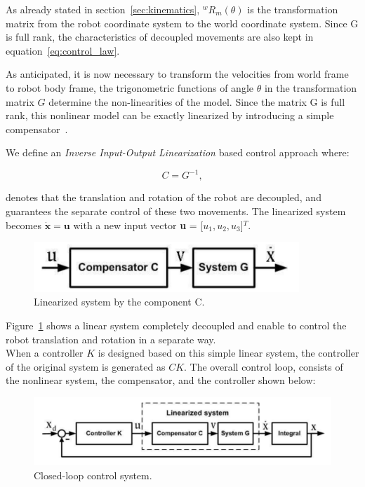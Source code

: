 As already stated in section~\ref{sec:kinematics}, $^wR_m(\theta)$ is the transformation matrix from the robot coordinate system to the world coordinate system. Since G is full rank, the characteristics of decoupled movements are also kept in equation~\ref{eq:control_law}.

As anticipated, it is now necessary to transform the velocities from world frame to robot body frame, the trigonometric functions of angle $\theta$ in the transformation matrix $G$ determine the non-linearities of the model. Since the matrix G is full rank, this nonlinear model can be exactly linearized by introducing a simple compensator~\citep{li_motion_2009}.

We define an \textit{Inverse Input-Output Linearization} based control approach where:

\begin{equation}
    C = G^{-1},
\end{equation} 

denotes that the translation and rotation of the robot are decoupled, and guarantees the separate control of these two movements. The linearized system becomes $\mathbf{\dot{x}} = \mathbf{u}$ with a new input vector \textbf{u} = [$u_1,u_2,u_3$]$^T$.

\begin{figure}[H]
	\centering
	\includegraphics[width=10cm]{images/03-foundation/comp1}
	\caption{Linearized system by the component C.} 
	\label{comp1}
\end{figure}

Figure~\ref{comp1} shows a linear system completely decoupled and enable to control the robot translation and rotation in a separate way. \\
When a controller $K$ is designed based on this simple linear system, the controller of the original system is generated as $CK$. The overall control loop, consists of the nonlinear system, the compensator, and the controller shown below:

\begin{figure}[H]
	\centering
	\includegraphics[width=12cm]{images/03-foundation/comp2}
	\caption{Closed-loop control system.} 
	\label{comp2}
\end{figure}


